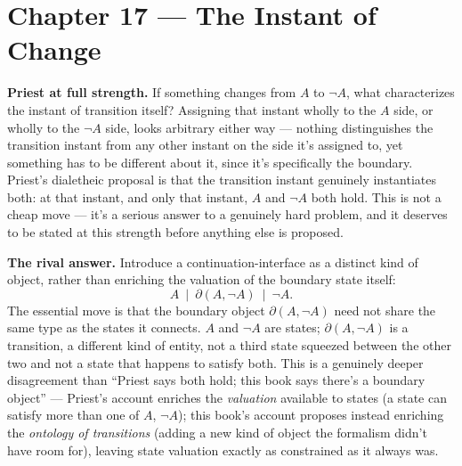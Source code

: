 \hypertarget{chapter-17-the-instant-of-change}{%
\chapter*{Chapter 17 --- The Instant of Change}
\label{chapter-17-the-instant-of-change}}

\textbf{Priest at full strength.} If something changes from \(A\) to \(\neg A\),
what characterizes the instant of transition itself? Assigning that
instant wholly to the \(A\) side, or wholly to the \(\neg A\) side, looks
arbitrary either way --- nothing distinguishes the transition instant from
any other instant on the side it's assigned to, yet something has to be
different about it, since it's specifically the boundary. Priest's
dialetheic proposal is that the transition instant genuinely instantiates
both: at that instant, and only that instant, \(A\) and \(\neg A\) both hold.
This is not a cheap move --- it's a serious answer to a genuinely hard
problem, and it deserves to be stated at this strength before anything
else is proposed.

\textbf{The rival answer.} Introduce a continuation-interface as a distinct
kind of object, rather than enriching the valuation of the boundary
state itself:
\[A \ \mid\ \partial(A, \neg A) \ \mid\ \neg A.\]
The essential move is that the boundary object \(\partial(A, \neg A)\)
need not share the same type as the states it connects. \(A\) and \(\neg A\)
are states; \(\partial(A, \neg A)\) is a transition, a different kind of
entity, not a third state squeezed between the other two and not a state
that happens to satisfy both. This is a genuinely deeper disagreement
than ``Priest says both hold; this book says there's a boundary object'' ---
Priest's account enriches the \emph{valuation} available to states (a state
can satisfy more than one of \(A\), \(\neg A\)); this book's account
proposes instead enriching the \emph{ontology of transitions} (adding a new
kind of object the formalism didn't have room for), leaving state
valuation exactly as constrained as it always was.

